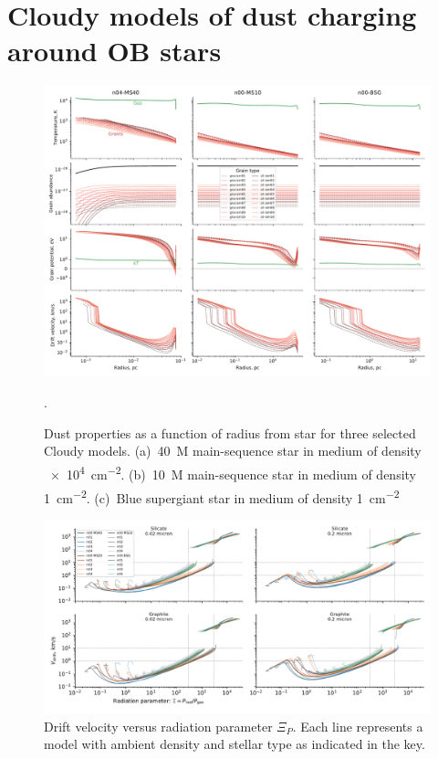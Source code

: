 
\section{Cloudy models of dust charging around OB stars}
\label{sec:cloudy-models-dust}

\begin{figure}
  \includegraphics[width=\linewidth]{figs/multi-dustprops}
  \caption{Dust properties as a function of radius from star for three
    selected Cloudy models. (a)~\SI{40}{M_\odot} main-sequence star in
    medium of density \SI{e4}{cm^{-2}}. (b)~\SI{10}{M_\odot} main-sequence
    star in medium of density \SI{1}{cm^{-2}}. (c)~Blue supergiant
    star in medium of density \SI{1}{cm^{-2}}}.
  \label{fig:multi-dustprops}
\end{figure}

\begin{figure}
  \includegraphics[width=\linewidth]{figs/drift-pratio-4panel}
  \caption{Drift velocity versus radiation parameter \(\Xi_P\). Each line
    represents a model with ambient density and stellar type as
    indicated in the key.}
  \label{fig:drift-gn}
\end{figure}


